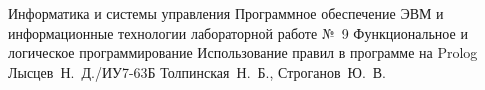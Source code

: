 \documentclass{bmstu}
\begin{document}
	
	\makereporttitle
	{Информатика и системы управления} %
	{Программное обеспечение ЭВМ и информационные технологии}
	{лабораторной работе №~9} %
	{Функциональное и логическое программирование} %
	{Использование правил в программе на Prolog} %
	{} %
	{Лысцев~Н.~Д./ИУ7-63Б} %
	{Толпинская~Н.~Б., Строганов~Ю.~В.} %
	{}
	
	
	
	
\end{document}
